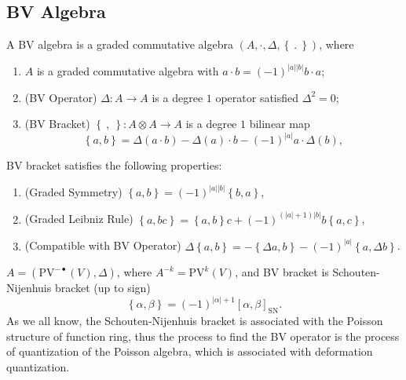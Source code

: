 \documentclass[10pt]{article}
\begin{document}
\subsection{BV Algebra}

\begin{definition}[BV Algebra]
  A BV algebra is a graded commutative algebra $ (A, \cdot, \Delta, \left\{ ~.~ \right\})$, where
  \begin{enumerate}[(1)]
    \item $ A$ is a graded commutative algebra with $ a \cdot b = (-1)^{\left| a \right|\left| b \right|} b \cdot a$;
    \item (BV Operator) $ \Delta : A \rightarrow A$ is a degree $ 1 $ operator satisfied $ \Delta^{2} = 0$;
    \item (BV Bracket) $\left\{ ~,~ \right\} : A \otimes A \rightarrow A$ is a degree $ 1$ bilinear map
      \begin{equation*}
        \left\{ a, b \right\} = \Delta(a \cdot b) - \Delta(a) \cdot b - (-1)^{\left| a \right|} a \cdot \Delta(b),
      \end{equation*}
  \end{enumerate}
\end{definition}
\begin{proposition}
  BV bracket satisfies the following properties:
  \begin{enumerate}[(1)]
    \item (Graded Symmetry) $\left\{ a,b \right\} = (-1)^{\left| a \right|\left| b \right|} \left\{ b, a \right\}$,
    \item (Graded Leibniz Rule) $\left\{ a, bc \right\} = \left\{ a, b \right\} c + (-1)^{(\left| a \right|+1)\left| b \right|} b \left\{ a,c \right\}$,
    \item (Compatible with BV Operator) $ \Delta\left\{ a,b \right\} = - \left\{ \Delta a, b \right\} - (-1)^{\left| a \right|} \left\{ a, \Delta b \right\}$.
  \end{enumerate}
\end{proposition}
\begin{example}
  $ A = \left( \mathrm{PV}^{-\bullet}(V), \Delta \right)$, where $ A^{-k} = \mathrm{PV}^{k}(V)$, and BV bracket is Schouten-Nijenhuis bracket (up to sign)
  \begin{equation*}
    \left\{ \alpha, \beta \right\} = (-1)^{\left| \alpha \right|+1} [\alpha, \beta]_{\mathrm{SN}}.
  \end{equation*}
  As we all know, the Schouten-Nijenhuis bracket is associated with the Poisson structure of function ring, thus the process to find the BV operator is the process of quantization of the Poisson algebra, which is associated with deformation quantization.
\end{example}
\end{document}
